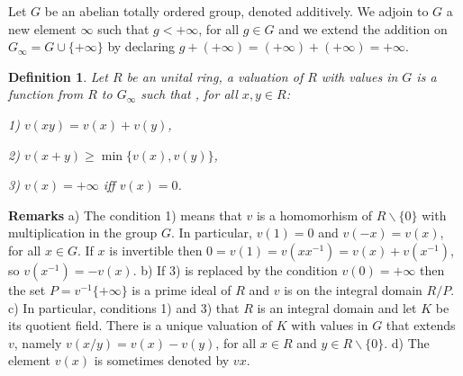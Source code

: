 \documentclass[12pt]{article}
\newtheorem{defn}{Definition}
\begin{document}
 Let $G$ be an abelian totally ordered group, denoted additively. We adjoin to $G$ a new element $\infty$ such that $g < +\infty$, for all $g\in G$ and we extend the addition on $G_{\infty} = G \cup \{+\infty\}$ by declaring $g + (+\infty) = (+\infty) + (+\infty) = +\infty$.
\begin{defn} Let $R$ be an unital ring, a \emph{valuation} of $R$ with values in $G$ is a function from $R$ to $G_{\infty}$ such that , for all $x, y \in R$:

1) $v(xy)= v(x)+v(y)$,

2) $v(x+y) \geq \min \{v(x),v(y)\}$,

3) $v(x)=+\infty$ iff $v(x)=0$.

\end{defn}
\textbf{Remarks} a) The condition 1) means that $v$ is a homomorhism of $R\smallsetminus\{0\}$ with multiplication in the group $G$. In particular, $v(1)=0$ and $v(-x)=v(x)$, for all $x\in G$. If $x$ is invertible then $0=v(1)=v(xx^{-1})=v(x)+v(x^{-1})$, so $v(x^{-1}) = -v(x)$.\newline
b) If 3) is replaced by the  condition $v(0)=+\infty$ then the set $P = v^{-1}\{+\infty\}$ is a prime ideal of $R$ and $v$ is  on the integral domain $R/P$.\newline
c) In particular, conditions 1) and 3)  that $R$ is an integral domain and let $K$ be its quotient field. There is a unique valuation of $K$ with values in $G$ that extends $v$, namely $v(x/y)=v(x)-v(y)$, for all $x\in R$ and $y\in R\smallsetminus\{0\}$.\newline
d) The element $v(x)$ is sometimes denoted by $vx$.

\end{document}
